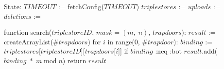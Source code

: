 State:
    $TIMEOUT$ := fetchConfig($TIMEOUT$)
    $triplestores$ := {}
    $uploads$ := {}
    $deletions$ := {}

function search($triplestoreID$, $mask = (m, \; n)$, $trapdoors$):
    $result$ := createArrayList($\#trapdoors$)
    for $i$ in range(0, $\#trapdoor$):
        $binding$ := $triplestores$[$triplestoreID$][$trapdoors$[$i$]]
        if $binding$ :neq :bot
            $result$.add($binding \; * \; m \; \textrm{mod} \; n$)
    return $result$